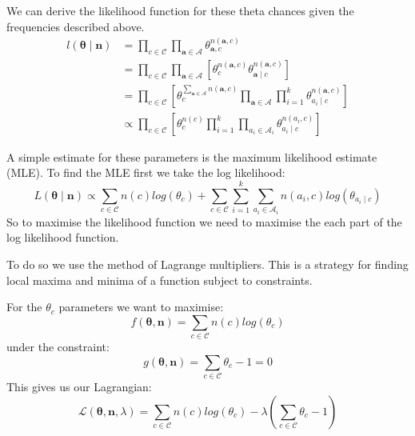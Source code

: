 We can derive the likelihood function for these theta chances given the frequencies described above.
\begin{align} \label{likelihood}
	l(\mathbf{\theta} \mid \mathbf{n}) & =  \prod_{c \in \mathcal{C}} \prod_{\mathbf{a} \in \mathbf{\mathcal{A}}} \theta_{\mathbf{a}, c}^{n(\mathbf{a}, c)} \\
	& = \prod_{c \in \mathcal{C}} \prod_{\mathbf{a} \in \mathbf{\mathcal{A}}} \left[ \theta_{c}^{n(\mathbf{a}, c)} \theta_{\mathbf{a} \mid c}^{n(\mathbf{a}, c)} \right] \\
	& = \prod_{c \in \mathcal{C}} \left[ \theta_{c}^{\sum_{\mathbf{a} \in \mathbf{\mathcal{A}}} n(\mathbf{a}, c)} \prod_{\mathbf{a} \in \mathbf{\mathcal{A}}} \prod_{i=1}^k \theta_{a_i \mid c}^{n(\mathbf{a}, c)} \right] \\
	& \propto \prod_{c \in \mathcal{C}} \left[ \theta_c^{n(c)} \prod_{i=1}^k \prod_{a_i \in \mathcal{A}_i} \theta_{a_i \mid c}^{n(a_i, c)} \right]
\end{align}

A simple estimate for these parameters is the maximum likelihood estimate (MLE).
To find the MLE first we take the log likelihood:
\begin{equation}
	L(\mathbf{\theta} \mid \mathbf{n}) \propto \sum_{c \in \mathcal{C}}  n(c)log(\theta_c) + \sum_{c \in \mathcal{C}} \sum_{i=1}^k \sum_{a_i \in \mathcal{A}_i} n(a_i, c) log(\theta_{a_i \mid c}) 
\end{equation}
So to maximise the likelihood function we need to maximise the each part of the log likelihood function.

To do so we use the method of Lagrange multipliers.
This is a strategy for finding local maxima and minima of a function subject to constraints.

For the $\theta_c$ parameters we want to maximise:
\begin{equation}
	f(\mathbf{\theta}, \mathbf{n}) = \sum_{c \in \mathcal{C}}  n(c)log(\theta_c)
\end{equation}
under the constraint:
\begin{equation}\label{theta_c constraint}
	g(\mathbf{\theta}, \mathbf{n}) = \sum_{c \in \mathcal{C}}  \theta_c - 1 = 0
\end{equation}
This gives us our Lagrangian:
\begin{equation}
	\mathcal{L}(\mathbf{\theta}, \mathbf{n}, \lambda) = \sum_{c \in \mathcal{C}}  n(c)log(\theta_c) - \lambda(\sum_{c \in \mathcal{C}}  \theta_c - 1)
\end{equation}


